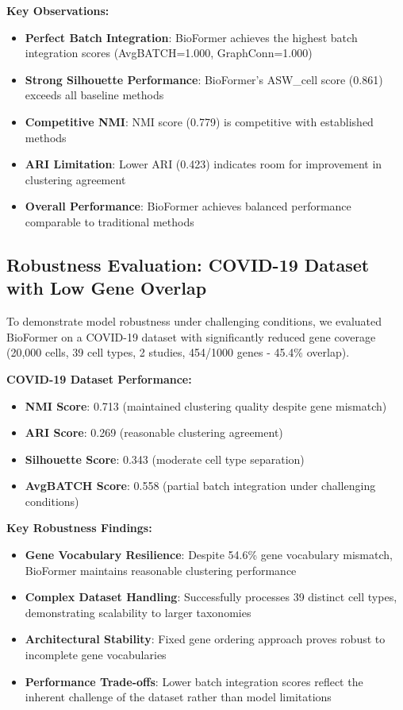 \textbf{Key Observations:}
\begin{itemize}
\item \textbf{Perfect Batch Integration}: BioFormer achieves the highest batch integration scores (AvgBATCH=1.000, GraphConn=1.000)
\item \textbf{Strong Silhouette Performance}: BioFormer's ASW\_cell score (0.861) exceeds all baseline methods
\item \textbf{Competitive NMI}: NMI score (0.779) is competitive with established methods
\item \textbf{ARI Limitation}: Lower ARI (0.423) indicates room for improvement in clustering agreement
\item \textbf{Overall Performance}: BioFormer achieves balanced performance comparable to traditional methods
\end{itemize}

\subsection{Robustness Evaluation: COVID-19 Dataset with Low Gene Overlap}

To demonstrate model robustness under challenging conditions, we evaluated BioFormer on a COVID-19 dataset with significantly reduced gene coverage (20,000 cells, 39 cell types, 2 studies, 454/1000 genes - 45.4\% overlap).

\textbf{COVID-19 Dataset Performance:}
\begin{itemize}
\item \textbf{NMI Score}: 0.713 (maintained clustering quality despite gene mismatch)
\item \textbf{ARI Score}: 0.269 (reasonable clustering agreement)
\item \textbf{Silhouette Score}: 0.343 (moderate cell type separation)
\item \textbf{AvgBATCH Score}: 0.558 (partial batch integration under challenging conditions)
\end{itemize}

\textbf{Key Robustness Findings:}
\begin{itemize}
\item \textbf{Gene Vocabulary Resilience}: Despite 54.6\% gene vocabulary mismatch, BioFormer maintains reasonable clustering performance
\item \textbf{Complex Dataset Handling}: Successfully processes 39 distinct cell types, demonstrating scalability to larger taxonomies
\item \textbf{Architectural Stability}: Fixed gene ordering approach proves robust to incomplete gene vocabularies
\item \textbf{Performance Trade-offs}: Lower batch integration scores reflect the inherent challenge of the dataset rather than model limitations
\end{itemize}

